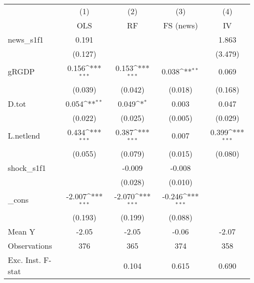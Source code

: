 {
\def\sym#1{\ifmmode^{#1}\else\(^{#1}\)\fi}
\begin{tabular}{l*{4}{c}}
\toprule
            &\multicolumn{1}{c}{(1)}&\multicolumn{1}{c}{(2)}&\multicolumn{1}{c}{(3)}&\multicolumn{1}{c}{(4)}\\
            &\multicolumn{1}{c}{OLS}&\multicolumn{1}{c}{RF}&\multicolumn{1}{c}{FS (news)}&\multicolumn{1}{c}{IV}\\
\midrule
news\_s1f1   &       0.191         &                     &                     &       1.863         \\
            &     (0.127)         &                     &                     &     (3.479)         \\
\addlinespace
gRGDP       &       0.156\sym{***}&       0.153\sym{***}&       0.038\sym{**} &       0.069         \\
            &     (0.039)         &     (0.042)         &     (0.018)         &     (0.168)         \\
\addlinespace
D.tot       &       0.054\sym{**} &       0.049\sym{*}  &       0.003         &       0.047         \\
            &     (0.022)         &     (0.025)         &     (0.005)         &     (0.029)         \\
\addlinespace
L.netlend   &       0.434\sym{***}&       0.387\sym{***}&       0.007         &       0.399\sym{***}\\
            &     (0.055)         &     (0.079)         &     (0.015)         &     (0.080)         \\
\addlinespace
shock\_s1f1  &                     &      -0.009         &      -0.008         &                     \\
            &                     &     (0.028)         &     (0.010)         &                     \\
\addlinespace
\_cons      &      -2.007\sym{***}&      -2.070\sym{***}&      -0.246\sym{***}&                     \\
            &     (0.193)         &     (0.199)         &     (0.088)         &                     \\
\midrule
Mean Y      &       -2.05         &       -2.05         &       -0.06         &       -2.07         \\
Observations&         376         &         365         &         374         &         358         \\
Exc. Inst. F-stat&                     &       0.104         &       0.615         &       0.690         \\
\bottomrule
\end{tabular}
}
